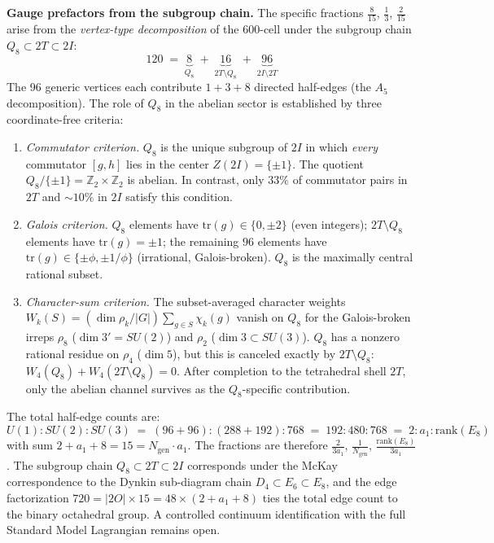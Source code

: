 \documentclass[12pt,a4paper]{article}
\theoremstyle{definition}
\begin{document}
\textbf{Gauge prefactors from the subgroup chain.}  The specific fractions $\frac{8}{15}$, $\frac{1}{3}$, $\frac{2}{15}$ arise from the \emph{vertex-type decomposition} of the 600-cell under the subgroup chain $Q_8 \subset 2T \subset 2I$:
\begin{equation}
120 \;=\; \underbrace{8}_{Q_8} \;+\; \underbrace{16}_{2T \setminus Q_8} \;+\; \underbrace{96}_{2I \setminus 2T}
\label{eq:vertex_decomposition}
\end{equation}
The 96 generic vertices each contribute $1 + 3 + 8$ directed half-edges (the $A_5$ decomposition).  The role of $Q_8$ in the abelian sector is established by three coordinate-free criteria:
\begin{enumerate}
\item[(i)] \emph{Commutator criterion.}  $Q_8$ is the unique subgroup of $2I$ in which \emph{every} commutator $[g,h]$ lies in the center $Z(2I) = \{\pm 1\}$.  The quotient $Q_8/\{\pm 1\} = \mathbb{Z}_2 \times \mathbb{Z}_2$ is abelian.  In contrast, only $33\%$ of commutator pairs in $2T$ and $\sim\!10\%$ in $2I$ satisfy this condition.
\item[(ii)] \emph{Galois criterion.}  $Q_8$ elements have $\mathrm{tr}(g) \in \{0, \pm 2\}$ (even integers); $2T \setminus Q_8$ elements have $\mathrm{tr}(g) = \pm 1$; the remaining $96$ elements have $\mathrm{tr}(g) \in \{\pm\phi, \pm 1/\phi\}$ (irrational, Galois-broken).  $Q_8$ is the maximally central rational subset.
\item[(iii)] \emph{Character-sum criterion.}  The subset-averaged character weights $W_k(S) = (\dim\rho_k/|G|)\sum_{g \in S}\chi_k(g)$ vanish on $Q_8$ for the Galois-broken irreps $\rho_8$ ($\dim 3' = SU(2)$) and $\rho_2$ ($\dim 3 \subset SU(3)$).  $Q_8$ has a nonzero rational residue on $\rho_4$ ($\dim 5$), but this is canceled exactly by $2T \setminus Q_8$: $W_4(Q_8) + W_4(2T \setminus Q_8) = 0$.  After completion to the tetrahedral shell $2T$, only the abelian channel survives as the $Q_8$-specific contribution.
\end{enumerate}
The total half-edge counts are:
\begin{equation}
U(1) : SU(2) : SU(3) \;=\; (96\!+\!96) : (288\!+\!192) : 768 \;=\; 192 : 480 : 768 \;=\; 2 : a_1 : \mathrm{rank}(E_8)
\label{eq:gauge_prefactors}
\end{equation}
with sum $2 + a_1 + 8 = 15 = N_{\mathrm{gen}} \cdot a_1$.  The fractions are therefore $\frac{2}{3a_1}$, $\frac{1}{N_{\mathrm{gen}}}$, $\frac{\mathrm{rank}(E_8)}{3a_1}$.  The subgroup chain $Q_8 \subset 2T \subset 2I$ corresponds under the McKay correspondence to the Dynkin sub-diagram chain $D_4 \subset E_6 \subset E_8$, and the edge factorization $720 = |2O| \times 15 = 48 \times (2 + a_1 + 8)$ ties the total edge count to the binary octahedral group.  A controlled continuum identification with the full Standard Model Lagrangian remains open.
\end{document}
